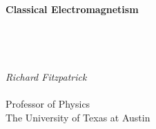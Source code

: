\documentclass[12pt]{rfbook}
\begin{document}
\thispagestyle{empty}
\begin{center}
{\Huge\bf Classical Electromagnetism}\\[1ex]
~\\
~\\
~\\
~\\
{\Large\em  Richard Fitzpatrick}\\[1.5ex]~\\[1.5ex]
{\Large\sf  Professor  of Physics}\\[1.5ex]
{\Large\sf  The University of Texas at Austin}
\end{center}

\pagestyle{fancy}
\renewcommand{\chaptermark}[1]{\markboth{#1}{}}
\fancyhf{}
\fancyhead[LO,RE]{\sl \leftmark}
\fancyhead[LE,RO]{\sl \thepage}

\tableofcontents










\end{document}
